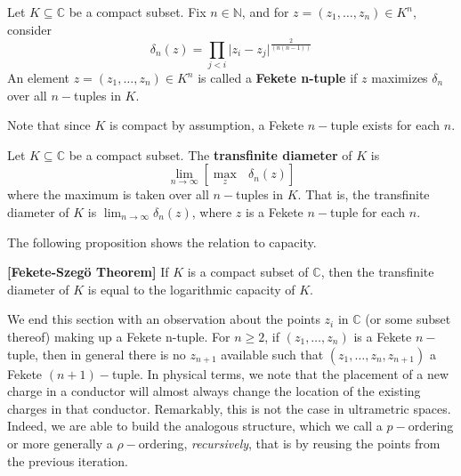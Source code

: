 \begin{definition}
Let $K \subseteq \mathbb{C}$ be a compact subset. Fix $n \in \mathbb{N}$, and for $z = (z_1,\ldots,z_n) \in K^n$, consider
\[\delta_n(z) = \prod_{j < i} \lvert z_i - z_j \rvert^{\frac{2}{(n(n-1))}} \]
An element $z = (z_1,\ldots,z_n) \in K^n$ is called a \textbf{Fekete n-tuple} if $z$ maximizes $\delta_n$ over all $n-$tuples in $K$.
\end{definition}

Note that since $K$ is compact by assumption, a Fekete $n-$tuple exists for each $n$.\\

\begin{definition}
Let $K \subseteq \mathbb{C}$ be a compact subset. The \textbf{transfinite diameter} of $K$ is \[ \lim_{n\to\infty} [ \max_z \text{ } \delta_n(z)]\] where the maximum is taken over all $n-$tuples in $K$. That is, the transfinite diameter of $K$ is $ \lim_{n\to\infty} \delta_n(z)$, where $z$ is a Fekete $n-$tuple for each $n$.
\end{definition}

The following proposition shows the relation to capacity.\\

\begin{proposition}
\textbf{[Fekete-Szeg\"o Theorem]}\cite{fek} If $K$ is a compact subset of $\mathbb{C}$, then the transfinite diameter of $K$ is equal to the logarithmic capacity of $K$.
\end{proposition}



We end this section with an observation about the points $z_i$ in $\mathbb{C}$ (or some subset thereof) making up a Fekete n-tuple. For $n \geq 2$, if $(z_1,\ldots,z_{n})$ is a Fekete $n-$tuple, then in general there is no $z_{n+1}$ available such that $(z_1,\ldots,z_n, z_{n+1})$ a Fekete $(n+1)-$tuple. In physical terms, we note that the placement of a new charge in a conductor will almost always change the location of the existing charges in that conductor. Remarkably, this is not the case in ultrametric spaces. Indeed, we are able to build the analogous structure, which we call a $p-$ordering or more generally a $\rho-$ordering, \textit{recursively}, that is by reusing the points from the previous iteration.\\ 

